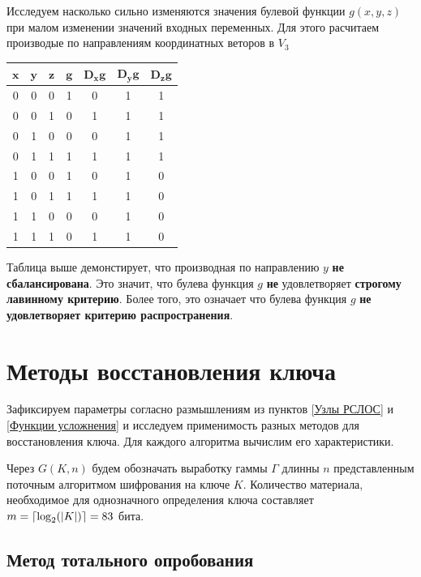 \documentclass[a4paper,12pt]{article}
\DeclarePairedDelimiter{\ceil}{\lceil}{\rceil}
\theoremstyle{definition}
\begin{document}
	Исследуем насколько сильно изменяются значения булевой функции $g(x, y, z)$ при малом изменении значений входных переменных. Для этого расчитаем производые по направлениям координатных веторов в $V_3$
	
	\begin{table}[h!]
		\begin{center}
			\begin{tabular}{|c|c|c||c||c|c|c|}
				\hline
				$ \pmb{x} $ & $ \pmb{y} $ & $ \pmb{z} $ & $ \pmb{g} $ & $ \pmb{D_x g} $ & $ \pmb{D_y g} $ & $ \pmb{D_z g} $ \\ \hline
				0 & 0 & 0 & 1 & 0 & 1 & 1 \\ \hline
				0 & 0 & 1 & 0 & 1 & 1 & 1 \\ \hline
				0 & 1 & 0 & 0 & 0 & 1 & 1 \\ \hline
				0 & 1 & 1 & 1 & 1 & 1 & 1 \\ \hline
				1 & 0 & 0 & 1 & 0 & 1 & 0 \\ \hline
				1 & 0 & 1 & 1 & 1 & 1 & 0 \\ \hline
				1 & 1 & 0 & 0 & 0 & 1 & 0 \\ \hline
				1 & 1 & 1 & 0 & 1 & 1 & 0 \\ \hline
			\end{tabular}
		\end{center}
	\end{table}
	
	Таблица выше демонстирует, что производная по направлению $y$ \textbf{не сбалансирована}. Это значит, что булева функция $g$ \textbf{не} удовлетворяет \textbf{строгому лавинному критерию}. Более того, это означает что булева функция $g$ \textbf{не удовлетворяет критерию распространения}.
	
	\section{Методы восстановления ключа}
	
	Зафиксируем параметры согласно размышлениям из пунктов \ref{Узлы РСЛОС} и \ref{Функции усложнения} и исследуем применимость разных методов для восстановления ключа. Для каждого алгоритма вычислим его характеристики.
	
	Через $G(K, n)$ будем обозначать выработку гаммы $\Gamma$ длинны $n$ представленным поточным алгоритмом шифрования на ключе $K$. Количество материала, необходимое для однозначного определения ключа составляет $m=\ceil{\log_2(|K|)}=83$ бита.
	
	\subsection{Метод тотального опробования}
	
\end{document}
